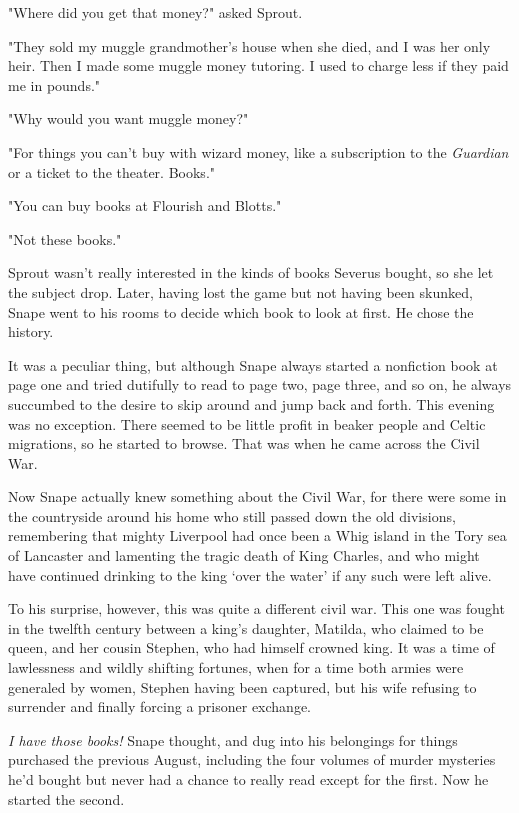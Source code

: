 "Where did you get that money?" asked Sprout.

"They sold my muggle grandmother's house when she died, and I was her only heir. Then I made some muggle money tutoring. I used to charge less if they paid me in pounds."

"Why would you want muggle money?"

"For things you can't buy with wizard money, like a subscription to the \emph{Guardian} or a ticket to the theater. Books."

"You can buy books at Flourish and Blotts."

"Not these books."

Sprout wasn't really interested in the kinds of books Severus bought, so she let the subject drop. Later, having lost the game but not having been skunked, Snape went to his rooms to decide which book to look at first. He chose the history.

It was a peculiar thing, but although Snape always started a nonfiction book at page one and tried dutifully to read to page two, page three, and so on, he always succumbed to the desire to skip around and jump back and forth. This evening was no exception. There seemed to be little profit in beaker people and Celtic migrations, so he started to browse. That was when he came across the Civil War.

Now Snape actually knew something about the Civil War, for there were some in the countryside around his home who still passed down the old divisions, remembering that mighty Liverpool had once been a Whig island in the Tory sea of Lancaster and lamenting the tragic death of King Charles, and who might have continued drinking to the king `over the water' if any such were left alive.

To his surprise, however, this was quite a different civil war. This one was fought in the twelfth century between a king's daughter, Matilda, who claimed to be queen, and her cousin Stephen, who had himself crowned king. It was a time of lawlessness and wildly shifting fortunes, when for a time both armies were generaled by women, Stephen having been captured, but his wife refusing to surrender and finally forcing a prisoner exchange.

\emph{I have those books!} Snape thought, and dug into his belongings for things purchased the previous August, including the four volumes of murder mysteries he'd bought but never had a chance to really read except for the first. Now he started the second.

